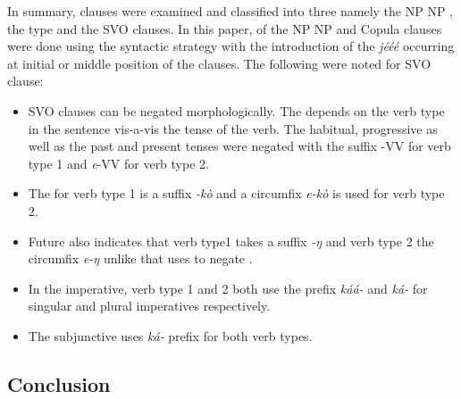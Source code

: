 \documentclass[output=paper
,newtxmath
,modfonts
,nonflat]{langsci/langscibook}
\begin{document}
In summary,  clauses were examined and classified into three namely the NP NP , the  type and the SVO clauses. In this paper,  of the NP NP and Copula clauses were done using the syntactic strategy with the introduction of the  \textit{j\'e\'e\'e} occurring at initial or middle position of the clauses. The following were noted for SVO clause:
\begin{itemize}
\item {} SVO clauses can be negated morphologically. The  depends on the verb type in the sentence vis-a-vis the tense of the verb. The habitual, progressive as well as the past and present tenses were negated with the suffix -VV for verb type 1 and \textit{e}-VV for verb type 2.

\item The   for verb type 1 is a suffix \textit{-k\`o} and a circumfix \textit{e-k\`o} is used for verb type 2.

\item Future  also indicates that verb type1 takes a suffix \textit{-ŋ} and verb type 2 the circumfix \textit{e-ŋ} unlike  that uses  to negate \citep{anash2003}.

\item In the imperative, verb type 1 and 2 both use the prefix \textit{k\'a\'a-} and \textit{k\'a-} for singular and plural imperatives respectively.

\item The subjunctive  uses \textit{k\'a-} prefix for both verb types.
\end{itemize}

\subsection{\label{sec:ollennu:3.1} Conclusion}
\end{document}
